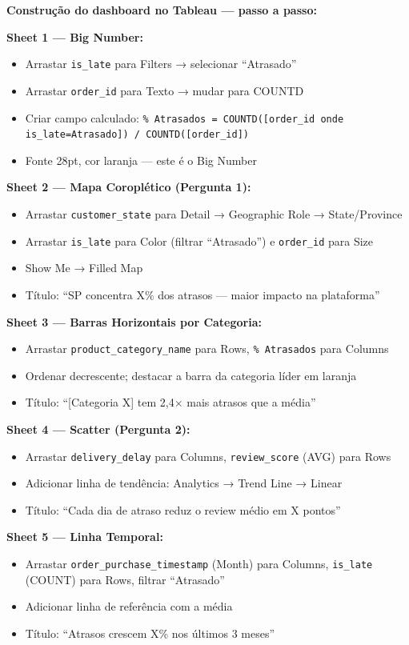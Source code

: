 \begin{SolvedBox}
\textbf{Construção do dashboard no Tableau — passo a passo:}

\textbf{Sheet 1 — Big Number:}
\begin{itemize}
  \item Arrastar \texttt{is\_late} para Filters → selecionar ``Atrasado''
  \item Arrastar \texttt{order\_id} para Texto → mudar para COUNTD
  \item Criar campo calculado: \texttt{\% Atrasados = COUNTD([order\_id onde is\_late=Atrasado]) / COUNTD([order\_id])}
  \item Fonte 28pt, cor laranja — este é o Big Number
\end{itemize}

\textbf{Sheet 2 — Mapa Coroplético (Pergunta 1):}
\begin{itemize}
  \item Arrastar \texttt{customer\_state} para Detail → Geographic Role → State/Province
  \item Arrastar \texttt{is\_late} para Color (filtrar ``Atrasado'') e \texttt{order\_id} para Size
  \item Show Me → Filled Map
  \item Título: ``SP concentra X\% dos atrasos — maior impacto na plataforma''
\end{itemize}

\textbf{Sheet 3 — Barras Horizontais por Categoria:}
\begin{itemize}
  \item Arrastar \texttt{product\_category\_name} para Rows, \texttt{\% Atrasados} para Columns
  \item Ordenar decrescente; destacar a barra da categoria líder em laranja
  \item Título: ``[Categoria X] tem 2,4$\times$ mais atrasos que a média''
\end{itemize}

\textbf{Sheet 4 — Scatter (Pergunta 2):}
\begin{itemize}
  \item Arrastar \texttt{delivery\_delay} para Columns, \texttt{review\_score} (AVG) para Rows
  \item Adicionar linha de tendência: Analytics → Trend Line → Linear
  \item Título: ``Cada dia de atraso reduz o review médio em X pontos''
\end{itemize}

\textbf{Sheet 5 — Linha Temporal:}
\begin{itemize}
  \item Arrastar \texttt{order\_purchase\_timestamp} (Month) para Columns,
  \texttt{is\_late} (COUNT) para Rows, filtrar ``Atrasado''
  \item Adicionar linha de referência com a média
  \item Título: ``Atrasos crescem X\% nos últimos 3 meses''
\end{itemize}


\end{SolvedBox}
